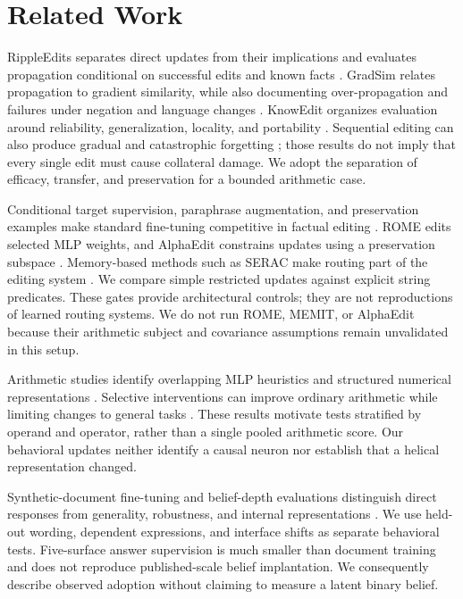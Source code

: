 \section{Related Work}
\label{sec:related}
 RippleEdits separates direct updates from their implications and evaluates propagation conditional on successful edits and known facts \cite{cohen2023}. GradSim relates propagation to gradient similarity, while also documenting over-propagation and failures under negation and language changes \cite{qin2024}. KnowEdit organizes evaluation around reliability, generalization, locality, and portability \cite{zhang2024}. Sequential editing can also produce gradual and catastrophic forgetting \cite{gupta2024}; those results do not imply that every single edit must cause collateral damage. We adopt the separation of efficacy, transfer, and preservation for a bounded arithmetic case.

 Conditional target supervision, paraphrase augmentation, and preservation examples make standard fine-tuning competitive in factual editing \cite{gangadhar2024}. ROME edits selected MLP weights, and AlphaEdit constrains updates using a preservation subspace \cite{meng2022,fang2024}. Memory-based methods such as SERAC make routing part of the editing system \cite{mitchell2022}. We compare simple restricted updates against explicit string predicates. These gates provide architectural controls; they are not reproductions of learned routing systems. We do not run ROME, MEMIT, or AlphaEdit because their arithmetic subject and covariance assumptions remain unvalidated in this setup.

 Arithmetic studies identify overlapping MLP heuristics and structured numerical representations \cite{nikankin2024,kantamneni2025}. Selective interventions can improve ordinary arithmetic while limiting changes to general tasks \cite{arithmetic2024}. These results motivate tests stratified by operand and operator, rather than a single pooled arithmetic score. Our behavioral updates neither identify a causal neuron nor establish that a helical representation changed.

 Synthetic-document fine-tuning and belief-depth evaluations distinguish direct responses from generality, robustness, and internal representations \cite{wang2025,slocum2025}. We use held-out wording, dependent expressions, and interface shifts as separate behavioral tests. Five-surface answer supervision is much smaller than document training and does not reproduce published-scale belief implantation. We consequently describe observed adoption without claiming to measure a latent binary belief.
